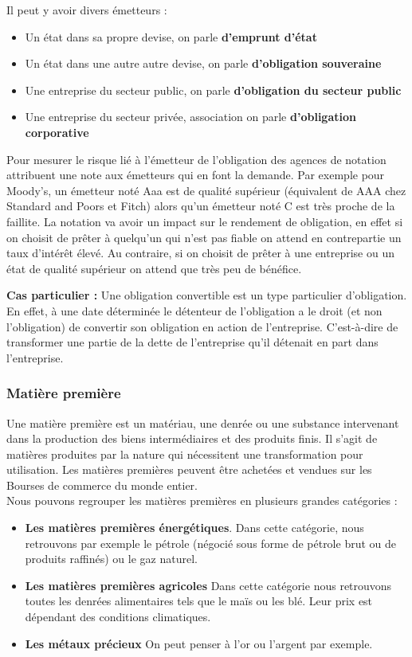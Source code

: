 Il peut y avoir divers émetteurs :
\begin{itemize}
\item Un état dans sa propre devise, on parle \textbf{d'emprunt d'état}
\item Un état dans une autre autre devise, on parle \textbf{d'obligation souveraine}
\item Une entreprise du secteur public, on parle \textbf{d'obligation du secteur public}
\item Une entreprise du secteur privée, association on parle \textbf{d'obligation corporative}
\end{itemize}

Pour mesurer le risque lié à l'émetteur de l'obligation des agences de notation attribuent une note aux émetteurs qui en font la demande. Par exemple pour Moody's, un émetteur noté Aaa est de qualité supérieur (équivalent de AAA chez Standard and Poors et Fitch) alors qu'un émetteur noté C est très proche de la faillite. La notation va avoir un impact sur le rendement de obligation, en effet si on choisit de prêter à quelqu'un qui n'est pas fiable on attend en contrepartie un taux d'intérêt élevé. Au contraire, si on choisit de prêter à une entreprise ou un état de qualité supérieur on attend que très peu de bénéfice. 

\textbf{Cas particulier : } Une obligation convertible est un type particulier d'obligation. En effet, à une date déterminée le détenteur de l'obligation a le droit (et non l'obligation) de convertir son obligation en action de l'entreprise. C'est-à-dire de transformer une partie de la dette de l'entreprise qu'il détenait en part dans l'entreprise. 

\subsubsection{Matière première}
Une matière première est un matériau, une denrée ou une substance intervenant dans la production des biens intermédiaires et des produits finis. Il s'agit de matières produites par la nature qui nécessitent une transformation pour utilisation. Les matières premières peuvent être achetées et vendues sur les Bourses de commerce du monde entier.\\

Nous pouvons regrouper les matières premières en plusieurs grandes catégories :\\
\begin{itemize}
\item \textbf{Les matières premières énergétiques}. Dans cette catégorie, nous retrouvons par exemple le pétrole (négocié sous forme de pétrole brut ou de produits raffinés) ou le gaz naturel. 
\item \textbf{Les matières premières agricoles} Dans cette catégorie nous retrouvons toutes les denrées alimentaires tels que le maïs ou les blé. Leur prix est dépendant des conditions climatiques.
\item \textbf{Les métaux précieux} On peut penser à l'or ou l'argent par exemple. 
\end{itemize}


